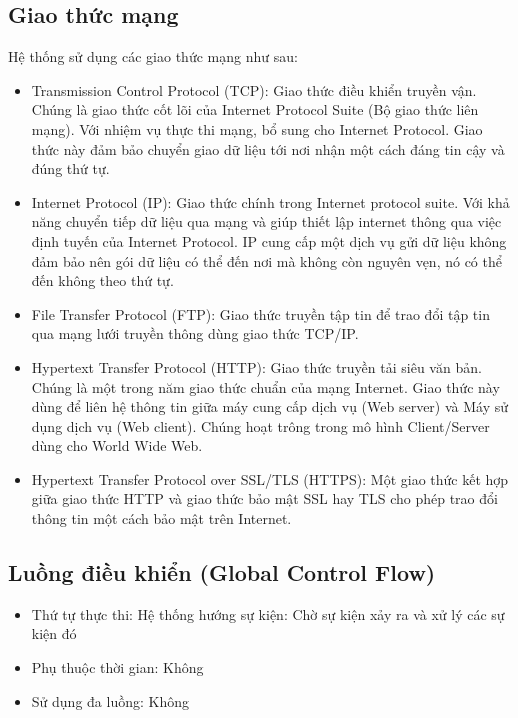 \documentclass[a4paper, 12pt]{article}
\begin{document}
\subsection{Giao thức mạng}

Hệ thống sử dụng các giao thức mạng như sau:
\begin{itemize}
	\item Transmission Control Protocol (TCP): Giao thức điều khiển truyền vận. Chúng là giao thức cốt lõi của Internet Protocol Suite (Bộ giao thức liên mạng). Với nhiệm vụ thực thi mạng, bổ sung cho Internet Protocol. Giao thức này đảm bảo chuyển giao dữ liệu tới nơi nhận một cách đáng tin cậy và đúng thứ tự.
	\item Internet Protocol (IP): Giao thức chính trong Internet protocol suite. Với khả năng chuyển tiếp dữ liệu qua mạng và giúp thiết lập internet thông qua việc định tuyến  của Internet Protocol. IP cung cấp một dịch vụ gửi dữ liệu không đảm bảo  nên gói dữ liệu có thể đến nơi mà không còn nguyên vẹn, nó có thể đến không theo thứ tự.
	\item File Transfer Protocol (FTP): Giao thức truyền tập tin để trao đổi tập tin qua mạng lưới truyền thông dùng giao thức TCP/IP.
	\item Hypertext Transfer Protocol (HTTP): Giao thức truyền tải siêu văn bản. Chúng là một trong năm giao thức chuẩn của mạng Internet. Giao thức này dùng để liên hệ thông tin giữa máy cung cấp dịch vụ (Web server) và Máy sử dụng dịch vụ (Web client). Chúng hoạt trông trong mô hình Client/Server dùng cho World Wide Web.
	\item Hypertext Transfer Protocol over SSL/TLS (HTTPS): Một giao thức kết hợp giữa giao thức HTTP và giao thức bảo mật SSL hay TLS cho phép trao đổi thông tin một cách bảo mật trên Internet.
\end{itemize}
\clearpage

\subsection{Luồng điều khiển (Global Control Flow)}

\begin{itemize}
	\item Thứ tự thực thi: Hệ thống hướng sự kiện: Chờ sự kiện xảy ra và xử lý các sự kiện đó
	\item Phụ thuộc thời gian: Không 
	\item Sử dụng đa luồng: Không 
\end{itemize}
\end{document}
